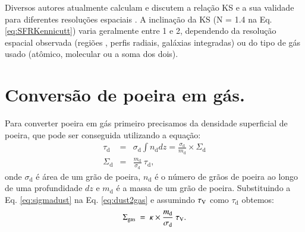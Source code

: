 Diversos autores atualmente calculam e discutem a relação KS e a sua validade para diferentes
resoluções espaciais \citep[e.g., ][]{Kennicutt.etal.2007a, Leroy.etal.2012a,
Calzetti.Liu.Koda.2012a, Lada.etal.2013a, Tacconi.etal.2013a, Casasola.etal.2015a}. A inclinação
da KS (N = 1.4 na Eq. \ref{eq:SFRKennicutt}) varia geralmente entre 1 e 2, dependendo da resolução
espacial observada (regiões \Hii, perfis radiais, galáxias integradas) ou do tipo de gás usado
(atômico, molecular ou a soma dos dois).

\section{Conversão de poeira em gás.}
\label{sec:gasfrac:gas2dust}

Para converter poeira em gás primeiro precisamos da densidade superficial de poeira, que pode ser
conseguida utilizando a equação:
\begin{eqnarray}
	\tau_{\mathrm{d}} &=& \sigma_{\mathrm{d}} \int n_{\mathrm{d}} dz =
	\frac{\sigma_{\mathrm{d}}}{m_{\mathrm{d}}}\times\Sigma_{\mathrm{d}}
	\\
	\Sigma_{\mathrm{d}} &=& \frac{m_{\mathrm{d}}}{\sigma_{\mathrm{d}}}\ \tau_{\mathrm{d}},
	\label{eq:sigmadust}
\end{eqnarray}
\noindent onde $\sigma_{\mathrm{d}}$ é área de um grão de poeira, $n_{\mathrm{d}}$ é o número de
grãos de poeira ao longo de uma profundidade $dz$ e $m_{\mathrm{d}}$ é a massa de um grão de
poeira. Substituindo a Eq. \ref{eq:sigmadust} na Eq. \ref{eq:dust2gas} e assumindo $\tau_{\mathrm{V}}$ como
$\tau_{\mathrm{d}}$ obtemos:
\begin{equation}
	\Sigma_{\mathrm{gas}}\ =\ \kappa \times \frac{m_{\mathrm{d}}}{\sigma_{\mathrm{d}}}\ \tau_{\mathrm{V}}. 
	\label{eq:dust2gas_tauV}
\end{equation}

